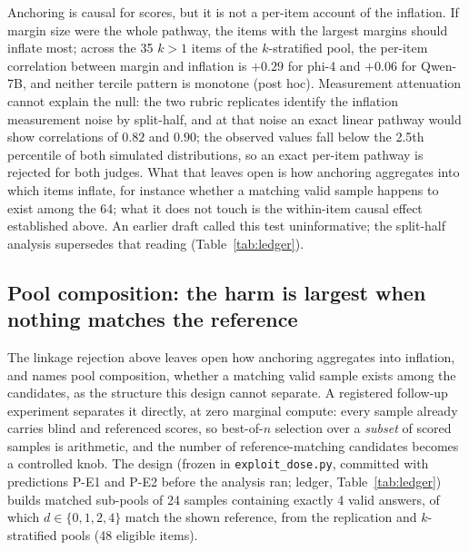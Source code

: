 \documentclass[11pt]{article}
\begin{document}
Anchoring is causal for scores, but it is not a per-item account of the inflation.
If margin size were the whole pathway, the items with the largest margins should inflate most; across the 35 $k{>}1$ items of the $k$-stratified pool, the per-item correlation between margin and inflation is $+0.29$ for phi-4 and $+0.06$ for Qwen-7B, and neither tercile pattern is monotone (post hoc).
Measurement attenuation cannot explain the null: the two rubric replicates identify the inflation measurement noise by split-half, and at that noise an exact linear pathway would show correlations of $0.82$ and $0.90$; the observed values fall below the 2.5th percentile of both simulated distributions, so an exact per-item pathway is rejected for both judges.
What that leaves open is how anchoring aggregates into which items inflate, for instance whether a matching valid sample happens to exist among the 64; what it does not touch is the within-item causal effect established above.
An earlier draft called this test uninformative; the split-half analysis supersedes that reading (Table~\ref{tab:ledger}).

\FloatBarrier
\subsection{Pool composition: the harm is largest when nothing matches the reference}
\label{sec:dose}

The linkage rejection above leaves open how anchoring aggregates into inflation, and names pool composition, whether a matching valid sample exists among the candidates, as the structure this design cannot separate.
A registered follow-up experiment separates it directly, at zero marginal compute: every sample already carries blind and referenced scores, so best-of-$n$ selection over a \emph{subset} of scored samples is arithmetic, and the number of reference-matching candidates becomes a controlled knob.
The design (frozen in \texttt{exploit\_dose.py}, committed with predictions P-E1 and P-E2 before the analysis ran; ledger, Table~\ref{tab:ledger}) builds matched sub-pools of 24 samples containing exactly 4 valid answers, of which $d \in \{0, 1, 2, 4\}$ match the shown reference, from the replication and $k$-stratified pools (48 eligible items).
\end{document}
